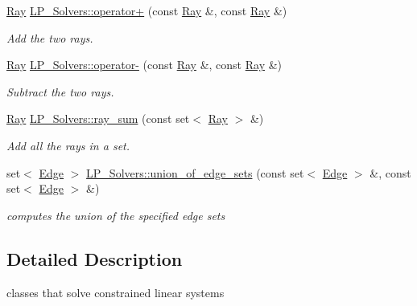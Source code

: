 \begin{DoxyCompactItemize}
\hyperlink{group___c_l_s_solvers_class_l_p___solvers_1_1_ray}{Ray} \hyperlink{group___c_l_s_solvers_gaf293c6d803dc697897463525aa1d1d44}{L\+P\+\_\+\+Solvers\+::operator+} (const \hyperlink{group___c_l_s_solvers_class_l_p___solvers_1_1_ray}{Ray} \&, const \hyperlink{group___c_l_s_solvers_class_l_p___solvers_1_1_ray}{Ray} \&)
\begin{DoxyCompactList}\small\item\em Add the two rays. \end{DoxyCompactList}\item 
\hyperlink{group___c_l_s_solvers_class_l_p___solvers_1_1_ray}{Ray} \hyperlink{group___c_l_s_solvers_gac20f6443d37909c326bb31c0399ea634}{L\+P\+\_\+\+Solvers\+::operator-\/} (const \hyperlink{group___c_l_s_solvers_class_l_p___solvers_1_1_ray}{Ray} \&, const \hyperlink{group___c_l_s_solvers_class_l_p___solvers_1_1_ray}{Ray} \&)
\begin{DoxyCompactList}\small\item\em Subtract the two rays. \end{DoxyCompactList}\item 
\hyperlink{group___c_l_s_solvers_class_l_p___solvers_1_1_ray}{Ray} \hyperlink{group___c_l_s_solvers_ga42f6aa14b6c3adb4df26f8338d486401}{L\+P\+\_\+\+Solvers\+::ray\+\_\+sum} (const set$<$ \hyperlink{group___c_l_s_solvers_class_l_p___solvers_1_1_ray}{Ray} $>$ \&)
\begin{DoxyCompactList}\small\item\em Add all the rays in a set. \end{DoxyCompactList}\item 
set$<$ \hyperlink{group___c_l_s_solvers_class_l_p___solvers_1_1_edge}{Edge} $>$ \hyperlink{group___c_l_s_solvers_ga8b57096f9dac0f00912dd248cfdc89db}{L\+P\+\_\+\+Solvers\+::union\+\_\+of\+\_\+edge\+\_\+sets} (const set$<$ \hyperlink{group___c_l_s_solvers_class_l_p___solvers_1_1_edge}{Edge} $>$ \&, const set$<$ \hyperlink{group___c_l_s_solvers_class_l_p___solvers_1_1_edge}{Edge} $>$ \&)
\begin{DoxyCompactList}\small\item\em computes the union of the specified edge sets \end{DoxyCompactList}\end{DoxyCompactItemize}


\subsection{Detailed Description}
classes that solve constrained linear systems 

